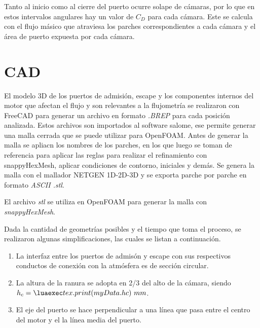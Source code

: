 %
Tanto al inicio como al cierre del puerto ocurre solape de cámaras, por lo que
en estos intervalos angulares hay un valor de $C_D$ para cada cámara.
%
Este se calcula con el flujo másico que atraviesa los parches correspondientes
a cada cámara y el área de puerto expuesta por cada cámara.

\section{CAD}
%
El modelo 3D de los puertos de admisión, escape y los componentes internos del
motor que afectan el flujo y son relevantes a la flujometría se realizaron con
FreeCAD\cite{freecad} para generar un archivo en formato \emph{.BREP} para cada
posición analizada.
%
Estos archivos son importados al software salome\cite{salome}, ese permite
generar una malla cerrada que se puede utilizar para OpenFOAM. 
%
Antes de generar la malla se apliacn los nombres de los parches, en los que
luego se toman de referencia para aplicar las reglas para realizar el
refinamiento con snappyHexMesh, aplicar condiciones de contorno, iniciales y
demás.
%
Se genera la malla con el mallador NETGEN 1D-2D-3D y se exporta parche por
parche en formato \emph{ASCII .stl}.

%
El archivo \emph{stl} se utiliza en OpenFOAM para generar la malla con
\emph{snappyHexMesh}.

Dada la cantidad de geometrías posibles y el tiempo que toma el proceso, se
realizaron algunas simplificaciones, las cuales se listan a continuación.

%
\begin{enumerate}

    \item La interfaz entre los puertos de admisón y escape con sus respectivos
        conductos de conexión con la atmósfera es de sección circular.
    \item La altura de la ranura se adopta en 2/3 del alto de la cámara, siendo
        $h_c=\lua{tex.print(myData.hc)}\ mm$.
    \item El eje del puerto se hace perpendicular a una línea que pasa entre el
        centro del motor y el la línea media del puerto.

\end{enumerate}

